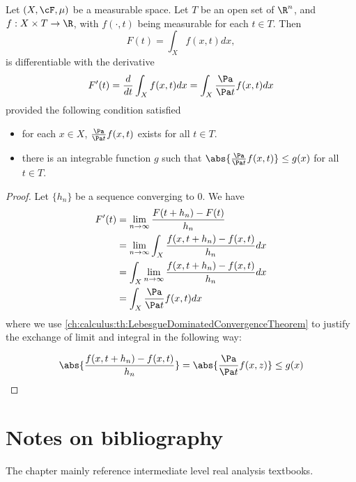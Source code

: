 \begin{refsection}
\begin{theorem}\cite[35]{cheng2008crash}
Let $(X,\cF,\mu)$ be a measurable space. Let $T$ be an open set of $\R^n$, and $f:X\times T\to \R$, with $f(\cdot,t)$ being measurable for each $t\in T$. 
Then
$$F(t) = \int_X f(x,t)dx,$$
is differentiable with the derivative
$$F'(t) = \frac{d}{dt}\int_X f(x,t) dx = \int_X \frac{\Pa}{\Pa t} f(x,t)dx$$
provided the following condition satisfied
\begin{itemize}
	\item for each $x\in X$, $\frac{\Pa}{\Pa t} f(x,t)$ exists for all $t\in T$.
	\item there is an integrable function $g$ such that $\abs{\frac{\Pa}{\Pa t} f(x,t)} \leq g(x)$ for all $t\in T$. 
\end{itemize}	
\end{theorem}
\begin{proof}
Let $\{h_n\}$ be a sequence converging to 0. We have 	
\begin{align*}
F'(t) &= \lim_{n\to\infty} \frac{F(t+h_n) - F(t)}{h_n} \\
&= \lim_{n\to\infty} \int_X \frac{f(x,t+h_n) - f(x,t)}{h_n} dx \\
&=  \int_X \lim_{n\to\infty}\frac{f(x,t+h_n) - f(x,t)}{h_n} dx \\
&=  \int_X \frac{\Pa}{\Pa t} f(x,t) dx 
\end{align*}
where we use \autoref{ch:calculus:th:LebesgueDominatedConvergenceTheorem} to justify the exchange of limit and integral in the following way:

$$\abs{\frac{f(x,t+h_n) - f(x,t)}{h_n}} = \abs{\frac{\Pa }{\Pa t}f(x,z)} \leq g(x)$$
\end{proof}


\section{Notes on bibliography}
The chapter mainly reference intermediate level real analysis textbooks\cite{johnsonbaugh2010foundations}\cite{abbott2001understanding}\cite{thomson2001elementary}.

\cite{duren2012invitation}

\printbibliography
\end{refsection}
